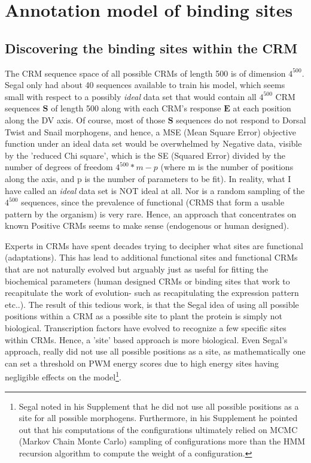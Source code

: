   
  \section{ Annotation model of binding sites}
\subsection{Discovering the binding sites within the CRM}
The CRM sequence space of all possible CRMs of length 500 is of dimension $4^{500}$.  Segal only had about 40 sequences available to train his model, which seems small with respect to a possibly \emph{ideal} data set that would contain all $4^{500}$ CRM sequences $\textbf{S}$ of length 500 along with each CRM's response $\textbf{E}$ at each position along the DV axis.  Of course, most of those $\textbf{S}$ sequences do not respond to Dorsal Twist and Snail morphogens, and hence, a MSE (Mean Square Error) objective function under an ideal data set would be overwhelmed by Negative data, visible by the 'reduced Chi square', which  is the SE (Squared Error) divided by the number of degrees of freedom $4^{500} * m - p$ (where m is the number of positions along the axis, and p is the number of parameters to be fit).  In reality, what I have called an \emph{ideal} data set is NOT ideal at all.  Nor is a random sampling of the $4^{500}$ sequences, since the prevalence of functional (CRMS that form a usable pattern by the organism) is very rare.  Hence, an approach that concentrates on known Positive CRMs seems to make sense (endogenous or human designed).

Experts in CRMs have spent decades trying to decipher what sites are functional (adaptations).  This has lead to additional functional sites and functional CRMs that are not naturally evolved but arguably just as useful for fitting the biochemical parameters (human designed CRMs or binding sites that work to recapitulate the work of evolution- such as recapitulating the expression pattern etc..). The result of this tedious work, is that the Segal idea of using all possible positions within a CRM as a possible site to plant the protein is simply not biological.  Transcription factors have evolved to recognize a few specific sites within CRMs.  Hence, a 'site' based approach is more biological.  Even Segal's approach, really did not use all possible positions as a site, as mathematically one can set a threshold on PWM energy scores due to high energy sites having negligible effects on the model\footnote{Segal noted in his Supplement that he did not use all possible positions as a site for all possible morphogens.  Furthermore, in his Supplement he pointed out that his computations of the configurations ultimately relied on MCMC (Markov Chain Monte Carlo) sampling of configurations more than the HMM recursion algorithm to compute the weight of a configuration.}.  


